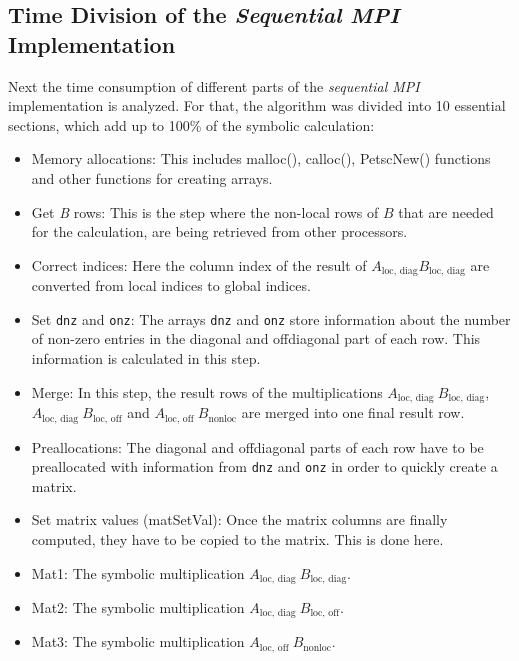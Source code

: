 \subsection{Time Division of the \textit{Sequential MPI} Implementation}

Next the time consumption of different parts of the \textit{sequential MPI} implementation is analyzed. For that, the algorithm was divided into 10 essential sections, which add up to 100\% of the symbolic calculation:

\begin{itemize}
\item Memory allocations: This includes malloc(), calloc(), PetscNew() functions and other functions for creating arrays.
\item Get \textit{B} rows: This is the step where the non-local rows of $B$ that are needed for the calculation, are being retrieved from other processors.
\item Correct indices: Here the column index of the result of $A_{\textrm{loc, diag}} B_{\textrm{loc, diag}}$ are converted from local indices to global indices.
\item Set \texttt{dnz} and \texttt{onz}: The arrays \texttt{dnz} and \texttt{onz} store information about the number of non-zero entries in the diagonal and offdiagonal part of each row. This information is calculated in this step. 
\item Merge: In this step, the result rows of the multiplications $A_{\textrm{loc, diag~}} B_{\textrm{loc, diag}}$,   \\$A_{\textrm{loc, diag~}} B_{\textrm{loc, off}}$ and $A_{\textrm{loc, off~}} B_{\textrm{nonloc}}$ are merged into one final result row.
\item Preallocations: The diagonal and offdiagonal parts of each row have to be preallocated with information from \texttt{dnz} and \texttt{onz} in order to quickly create a matrix.
\item Set matrix values (matSetVal): Once the matrix columns are finally computed, they have to be copied to the matrix. This is done here.
\item Mat1: The symbolic multiplication $A_{\textrm{loc, diag~}} B_{\textrm{loc, diag}}$.
\item Mat2: The symbolic multiplication $A_{\textrm{loc, diag~}} B_{\textrm{loc, off}}$.
\item Mat3: The symbolic multiplication $A_{\textrm{loc, off~}} B_{\textrm{nonloc}}$.
\end{itemize}

